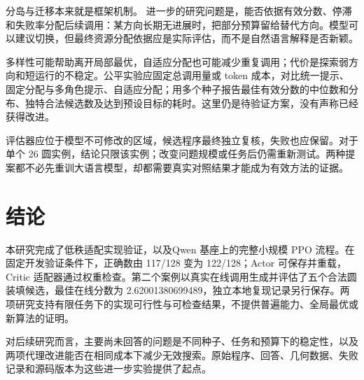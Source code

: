 分岛与迁移本来就是框架机制。\cite{islands} 进一步的研究问题是，能否依据有效分数、停滞和失败率分配后续调用：某方向长期无进展时，把部分预算留给替代方向。模型可以建议切换，但最终资源分配依据应是实际评估，而不是自然语言解释是否新颖。

多样性可能帮助离开局部最优，自适应分配也可能减少重复调用；代价是探索弱方向和短运行的不稳定。公平实验应固定总调用量或 token 成本，对比统一提示、固定分配与多角色提示、自适应分配；用多个种子报告最佳有效分数的中位数和分布、独特合法候选数及达到预设目标的耗时。这里仍是待验证方案，没有声称已经获得改进。

评估器应位于模型不可修改的区域，候选程序最终独立复核，失败也应保留。对于单个 26 圆实例，结论只限该实例；改变问题规模或任务后仍需重新测试。两种提案都不必先重训大语言模型，却都需要真实对照结果才能成为有效方法的证据。

\section{结论}
本研究完成了低秩适配实现验证，以及Qwen 基座上的完整小规模 PPO 流程。在固定开发验证条件下，正确数由 117/128 变为 122/128；Actor 可保存并重载，Critic 适配器通过权重检查。第二个案例以真实在线调用生成并评估了五个合法圆装填候选，最佳在线分数为 2.62001380699489，独立本地复现记录另行保存。两项研究支持有限任务下的实现可行性与可检查结果，不提供普遍能力、全局最优或新算法的证明。

对后续研究而言，主要尚未回答的问题是不同种子、任务和预算下的稳定性，以及两项代理改进能否在相同成本下减少无效搜索。原始程序、回答、几何数据、失败记录和源码版本为这些进一步实验提供了起点。
